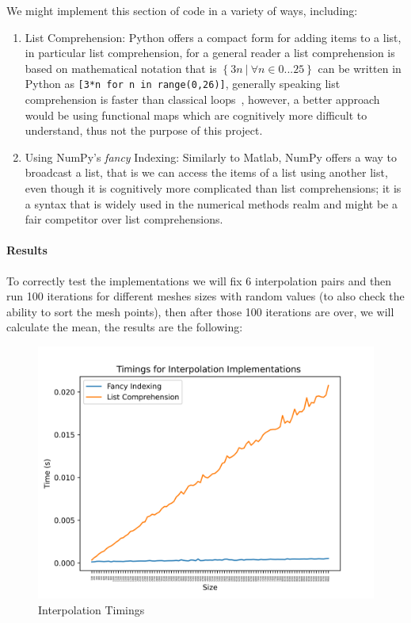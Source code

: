 We might implement this section of code in a variety of ways, including:
\begin{enumerate}
    \item List Comprehension: Python offers a compact form for adding items to a list, in particular list comprehension, for a general reader a list comprehension is based on mathematical notation that is $\left\{ 3n\ |\ \forall n\in 0...25\right\}$ can be written in Python as \lstinline|[3*n for n in range(0,26)]|, generally speaking list comprehension is faster than classical loops~\cite{PythonSpeedPerformanceTips}, however, a better approach would be using functional maps which are cognitively more difficult to understand, thus not the purpose of this project.

    \item Using NumPy's \textit{fancy} Indexing: Similarly to Matlab, NumPy offers a way to broadcast a list, that is we can access the items of a list using another list, even though it is cognitively more complicated than list comprehensions; it is a syntax that is widely used in the numerical methods realm and might be a fair competitor over list comprehensions.
    
\end{enumerate}
\paragraph{Results}
To correctly test the implementations we will fix 6 interpolation pairs and then run 100 iterations for different meshes sizes with random values (to also check the ability to sort the mesh points), then after those 100 iterations are over, we will calculate the mean, the results are the following:
\begin{figure}[H]
    \centering
    \includegraphics[scale=0.9]{Include/Images/Thesis/Analysis of Solutions/Interpolation/Interpolation Timings.png}
    \caption{Interpolation Timings}
    \label{fig:Interpolation Timings}
\end{figure}

